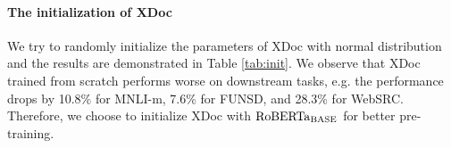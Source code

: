 \documentclass[11pt]{article}
\begin{document}
\begin{table}[t]
\centering
{}
\caption{Results on the initialization of XDoc.}
\label{tab:init}
\end{table}



\begin{table}[t]
\centering
{}
\caption{Results on the symmetry and number of adaptive layers. $^{\dag}$ means that the document and web branches share the same adaptive layers.}
\label{tab:adaptive}
\end{table}


\paragraph{The initialization of XDoc}
We try to randomly initialize the parameters of XDoc with normal distribution and the results are demonstrated in Table \ref{tab:init}.  We observe that XDoc trained from scratch performs worse on downstream tasks, e.g. the performance drops by 10.8\% for MNLI-m, 7.6\% for FUNSD, and 28.3\% for WebSRC. Therefore, we choose to initialize XDoc with ${\rm {RoBERTa}_{BASE}}$ for better pre-training.
\end{document}
